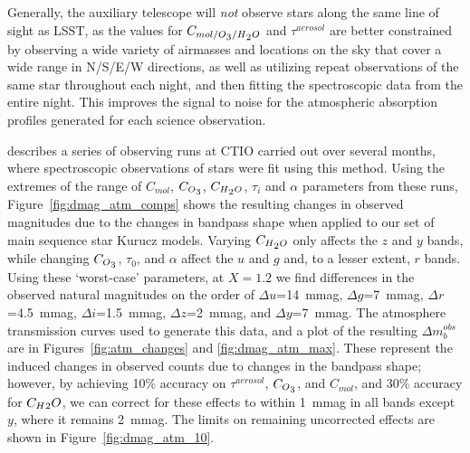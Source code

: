 \documentclass[12pt,preprint]{aastex}
\newcommand{\water}   {H\textsubscript{2}O}
\newcommand{\ozone}    {O\textsubscript{3}}
\begin{document}
Generally, the auxiliary telescope will {\it not} observe stars along the
same line of sight as LSST, as the values for
$C_{mol/\ozone/\water}$ and $\tau^{aerosol}$ are better
constrained by observing a wide variety of airmasses and locations on
the sky that cover a wide range in N/S/E/W directions, as well as utilizing
repeat observations of the same star throughout each night, and then
fitting the spectroscopic data from the entire night. This improves the 
signal to noise for the atmospheric absorption profiles generated for each science observation.


\citet{Burke2010b} describes a series of observing runs at CTIO carried out over several
months, where spectroscopic observations of stars were fit using this method. Using the extremes of the range of $C_{mol}$,
$C_{\ozone}$, $C_{\water}$, $\tau_i$ and $\alpha$ parameters from these runs,
Figure~\ref{fig:dmag_atm_comps} shows the resulting changes in
observed magnitudes due to the changes in bandpass shape when applied
to our set of main sequence star Kurucz models. Varying
$C_{\water}$ only affects the $z$ and $y$ bands, while changing $C_{\ozone}$,
$\tau_0$, and $\alpha$ affect the $u$ and $g$ and, to a lesser extent, $r$
bands. Using these `worst-case' parameters, at $X=1.2$ we find
differences in the observed natural magnitudes on the order of $\Delta u$=14~mmag, $\Delta g$=7~mmag, $\Delta r$=4.5~mmag,
$\Delta i$=1.5~mmag, $\Delta z$=2~mmag, and $\Delta y$=7~mmag. The 
atmosphere transmission curves used to generate this data, and a plot
of the resulting $\Delta m_b^{obs}$ are in Figures~\ref{fig:atm_changes}
and \ref{fig:dmag_atm_max}.  These represent the induced changes in
observed counts due to changes in the bandpass shape; however, by
achieving 10\% accuracy on $\tau^{aerosol}$, $C_{\ozone}$, and
$C_{mol}$, and 30\% accuracy for $C_\water$, we can correct for
these effects to within 1~mmag in all bands except $y$, where it
remains 2~mmag. The limits on remaining uncorrected effects are shown in Figure~\ref{fig:dmag_atm_10}. 
\end{document}

